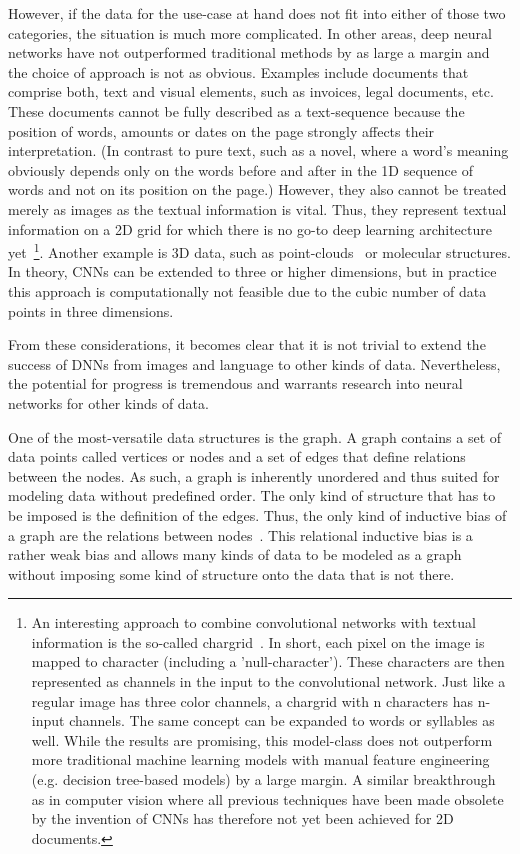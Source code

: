 However, if the data for the use-case at hand does not fit into either of those two categories, the situation is much more complicated. In other areas, deep neural networks have not outperformed traditional methods by as large a margin and the choice of approach is not as obvious. Examples include documents that comprise both, text and visual elements, such as invoices, legal documents, etc. These documents cannot be fully described as a text-sequence because the position of words, amounts or dates on the page strongly affects their interpretation. (In contrast to pure text, such as a novel, where a word's meaning obviously depends only on the words before and after in the 1D sequence of words and not on its position on the page.) However, they also cannot be treated merely as images as the textual information is vital. Thus, they represent textual information on a 2D grid for which there is no go-to deep learning architecture yet~\footnote{
	An interesting approach to combine convolutional networks with textual information is the so-called chargrid~\cite{Katti2020}. In short, each pixel on the image is mapped to character (including a 'null-character'). These characters are then represented as channels in the input to the convolutional network. Just like a regular image has three color channels, a chargrid with n characters has n-input channels. The same concept can be expanded to words or syllables as well. While the results are promising, this model-class does not outperform more traditional machine learning models with manual feature engineering (e.g. decision tree-based models) by a large margin. A similar breakthrough as in computer vision where all previous techniques have been made obsolete by the invention of CNNs has therefore not yet been achieved for 2D documents.
}. Another example is 3D data, such as point-clouds~\cite{Charles2017} or molecular structures. In theory, CNNs can be extended to three or higher dimensions, but in practice this approach is computationally not feasible due to the cubic number of data points in three dimensions.

From these considerations, it becomes clear that it is not trivial to extend the success of DNNs from images and language to other kinds of data. Nevertheless, the potential for progress is tremendous and warrants research into neural networks for other kinds of data.

One of the most-versatile data structures is the graph. A graph contains a set of data points called vertices or nodes and a set of edges that define relations between the nodes. As such, a graph is inherently unordered and thus suited for modeling data without predefined order. The only kind of structure that has to be imposed is the definition of the edges. Thus, the only kind of inductive bias of a graph are the relations between nodes~\cite{Battaglia2018}. This relational inductive bias is a rather weak bias and allows many kinds of data to be modeled as a graph without imposing some kind of structure onto the data that is not there.

